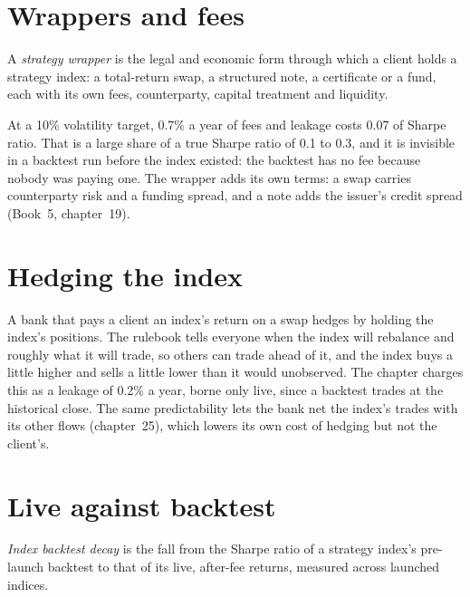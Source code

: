 \section{Wrappers and fees}

\begin{definition}\label{def:s2:quantitative-investment-strategies:wrapper}
A \emph{strategy wrapper} is the legal and economic form through which a client holds a strategy index: a total-return swap,
a structured note, a certificate or a fund, each with its own fees, counterparty, capital treatment and liquidity.
\end{definition}

At a 10\% volatility target, 0.7\% a year of fees and leakage costs 0.07 of Sharpe ratio. That is a large share of a true Sharpe ratio of 0.1 to 0.3,
and it is invisible in a backtest run before the index existed: the backtest has no fee because nobody was paying one. The wrapper adds its own terms:
a swap carries counterparty risk and a funding spread, and a note adds the issuer's credit spread (Book~5, chapter~19).

\section{Hedging the index}

A bank that pays a client an index's return on a swap hedges by holding the index's positions. The rulebook tells everyone when the index will
rebalance and roughly what it will trade, so others can trade ahead of it, and the index buys a little higher and sells a little lower than it would
unobserved. The chapter charges this as a leakage of 0.2\% a year, borne only live, since a backtest trades at the historical close. The same
predictability lets the bank net the index's trades with its other flows (chapter~25), which lowers its own cost of hedging but not the client's.

\section{Live against backtest}

\begin{definition}\label{def:s2:quantitative-investment-strategies:decay}
\emph{Index backtest decay} is the fall from the Sharpe ratio of a strategy index's pre-launch backtest to that of its
live, after-fee returns, measured across launched indices.
\end{definition}


